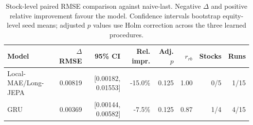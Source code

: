 \begin{table}[t]
\centering
\small
\caption{Stock-level paired RMSE comparison against naive-last. Negative $\Delta$ and positive relative improvement favour the model. Confidence intervals bootstrap equity-level seed means; adjusted $p$ values use Holm correction across the three learned procedures.}
\label{tab:paired_rmse_naive}
\begin{tabular}{lrrrrrrr}
\toprule
Model & $\Delta$RMSE & 95\% CI & Rel. impr. & Adj. $p$ & $r_{rb}$ & Stocks & Runs \\
\midrule
Local-MAE/Long-JEPA & 0.00819 & [0.00182, 0.01553] & -15.0\% & 0.125 & 1.00 & 0/5 & 1/15 \\
GRU & 0.00369 & [0.00144, 0.00582] & -7.5\% & 0.125 & 0.87 & 1/4 & 4/15 \\
\bottomrule
\end{tabular}
\end{table}
